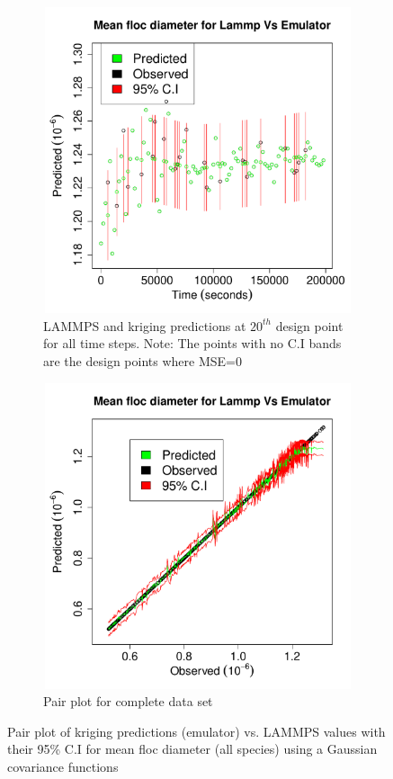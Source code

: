 \documentclass[12pt,titlepage]{report}
\theoremstyle{definition}
\theoremstyle{remark}
\begin{document}
\begin{figure}[!ht]
\begin{subfigure}[b]{.5\textwidth}
\includegraphics[height=9cm,width=1.1\textwidth]{ana/myplot5}
\caption{LAMMPS and kriging predictions at $20^{th}$ design point for all time steps. Note: The points with no C.I bands are the design points where MSE=0}
\label{myfigg9a1}
\end{subfigure}\hspace*{1em}
\begin{subfigure}[b]{.5\textwidth}
\includegraphics[height=9cm,width=1.1\textwidth]{ana/myplot3}
\caption{Pair plot for complete data set}
\label{myfigg9a2}
\end{subfigure}
\caption{Pair plot of kriging predictions (emulator) vs. LAMMPS values with their 95\% C.I for mean floc diameter (all species) using a Gaussian covariance functions}\label{myfig3}
\end{figure}
\end{document}

